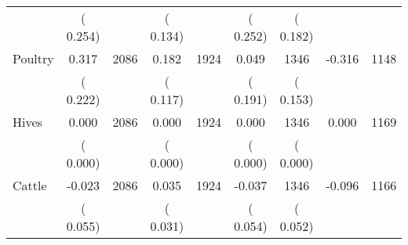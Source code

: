 \begin{tabular}{l*{8}{c}}
                       &       (       0.254)            &                               &       (       0.134)            &                               &       (       0.252)            &       (       0.182) &                  \\
Poultry        &              0.317      &       2086       &              0.182      &       1924       &              0.049      &       1346  &       -0.316 &       1148       \\
                       &       (       0.222)            &                               &       (       0.117)            &                               &       (       0.191)            &       (       0.153) &                  \\
Hives        &              0.000      &       2086       &              0.000      &       1924       &              0.000      &       1346  &        0.000 &       1169       \\
                       &       (       0.000)            &                               &       (       0.000)            &                               &       (       0.000)            &       (       0.000) &                  \\
Cattle        &             -0.023      &       2086       &              0.035      &       1924       &             -0.037      &       1346  &       -0.096 &       1166       \\
                       &       (       0.055)            &                               &       (       0.031)            &                               &       (       0.054)            &       (       0.052) &                  \\
\hline \end{tabular}